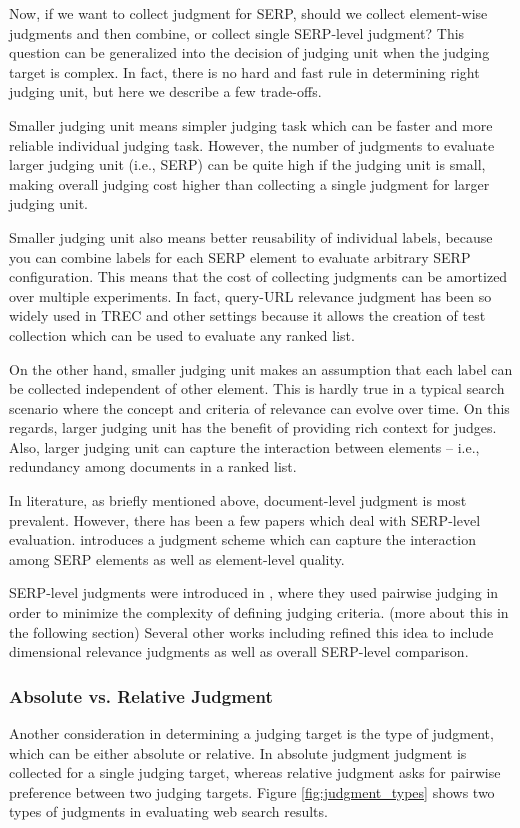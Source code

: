 \documentclass[openany]{now} %
\begin{document}
Now, if we want to collect judgment for SERP, should we collect element-wise judgments and then combine, or collect single SERP-level judgment? This question can be generalized into the decision of judging unit when the judging target is complex. In fact, there is no hard and fast rule in determining right judging unit, but here we describe a few trade-offs. 

Smaller judging unit means simpler judging task which can be faster and more reliable individual judging task. However, the number of judgments to evaluate larger judging unit (i.e., SERP) can be quite high if the judging unit is small, making overall judging cost higher than collecting a single judgment for larger judging unit.

Smaller judging unit also means better reusability of individual labels, because you can combine labels for each SERP element to evaluate arbitrary SERP configuration. This means that the cost of collecting judgments can be amortized over multiple experiments. In fact, query-URL relevance judgment has been so widely used in TREC and other settings because it allows the creation of test collection which can be used to evaluate any ranked list.

On the other hand, smaller judging unit makes an assumption that each label can be collected independent of other element. This is hardly true in a typical search scenario where the concept and criteria of relevance can evolve over time. On this regards, larger judging unit has the benefit of providing rich context for judges. Also, larger judging unit can capture the interaction between elements -- i.e., redundancy among documents in a ranked list.

In literature, as briefly mentioned above, document-level judgment is most prevalent. However, there has been a few papers which deal with SERP-level evaluation. \cite{Bailey2010} introduces a judgment scheme which can capture the interaction among SERP elements as well as element-level quality. 

SERP-level judgments were introduced in \cite{Thomas2006}, where they used pairwise judging in order to minimize the complexity of defining judging criteria. (more about this in the following section) Several other works including  \cite{Kim:2013} refined this idea to include dimensional relevance judgments as well as overall SERP-level comparison.

\subsubsection{Absolute vs. Relative Judgment}
Another consideration in determining a judging target is the type of judgment, which can be either absolute or relative. In absolute judgment judgment is collected for a single judging target, whereas relative judgment asks for pairwise preference between two judging targets. Figure \ref{fig:judgment_types} shows two types of judgments in evaluating web search results.
\end{document}
